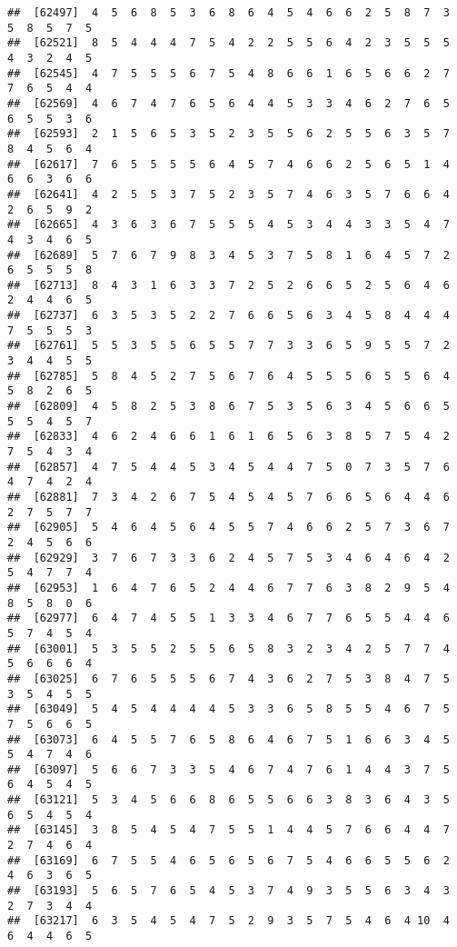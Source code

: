 \documentclass[
]{book}
\begin{document}
\begin{verbatim}
##  [62497]  4  5  6  8  5  3  6  8  6  4  5  4  6  6  2  5  8  7  3  5  8  5  7  5
##  [62521]  8  5  4  4  4  7  5  4  2  2  5  5  6  4  2  3  5  5  5  4  3  2  4  5
##  [62545]  4  7  5  5  5  6  7  5  4  8  6  6  1  6  5  6  6  2  7  7  6  5  4  4
##  [62569]  4  6  7  4  7  6  5  6  4  4  5  3  3  4  6  2  7  6  5  6  5  5  3  6
##  [62593]  2  1  5  6  5  3  5  2  3  5  5  6  2  5  5  6  3  5  7  8  4  5  6  4
##  [62617]  7  6  5  5  5  5  6  4  5  7  4  6  6  2  5  6  5  1  4  6  6  3  6  6
##  [62641]  4  2  5  5  3  7  5  2  3  5  7  4  6  3  5  7  6  6  4  2  6  5  9  2
##  [62665]  4  3  6  3  6  7  5  5  5  4  5  3  4  4  3  3  5  4  7  4  3  4  6  5
##  [62689]  5  7  6  7  9  8  3  4  5  3  7  5  8  1  6  4  5  7  2  6  5  5  5  8
##  [62713]  8  4  3  1  6  3  3  7  2  5  2  6  6  5  2  5  6  4  6  2  4  4  6  5
##  [62737]  6  3  5  3  5  2  2  7  6  6  5  6  3  4  5  8  4  4  4  7  5  5  5  3
##  [62761]  5  5  3  5  5  6  5  5  7  7  3  3  6  5  9  5  5  7  2  3  4  4  5  5
##  [62785]  5  8  4  5  2  7  5  6  7  6  4  5  5  5  6  5  5  6  4  5  8  2  6  5
##  [62809]  4  5  8  2  5  3  8  6  7  5  3  5  6  3  4  5  6  6  5  5  5  4  5  7
##  [62833]  4  6  2  4  6  6  1  6  1  6  5  6  3  8  5  7  5  4  2  7  5  4  3  4
##  [62857]  4  7  5  4  4  5  3  4  5  4  4  7  5  0  7  3  5  7  6  4  7  4  2  4
##  [62881]  7  3  4  2  6  7  5  4  5  4  5  7  6  6  5  6  4  4  6  2  7  5  7  7
##  [62905]  5  4  6  4  5  6  4  5  5  7  4  6  6  2  5  7  3  6  7  2  4  5  6  6
##  [62929]  3  7  6  7  3  3  6  2  4  5  7  5  3  4  6  4  6  4  2  5  4  7  7  4
##  [62953]  1  6  4  7  6  5  2  4  4  6  7  7  6  3  8  2  9  5  4  8  5  8  0  6
##  [62977]  6  4  7  4  5  5  1  3  3  4  6  7  7  6  5  5  4  4  6  5  7  4  5  4
##  [63001]  5  3  5  5  2  5  5  6  5  8  3  2  3  4  2  5  7  7  4  5  6  6  6  4
##  [63025]  6  7  6  5  5  5  6  7  4  3  6  2  7  5  3  8  4  7  5  3  5  4  5  5
##  [63049]  5  4  5  4  4  4  4  5  3  3  6  5  8  5  5  4  6  7  5  7  5  6  6  5
##  [63073]  6  4  5  5  7  6  5  8  6  4  6  7  5  1  6  6  3  4  5  5  4  7  4  6
##  [63097]  5  6  6  7  3  3  5  4  6  7  4  7  6  1  4  4  3  7  5  6  4  5  4  5
##  [63121]  5  3  4  5  6  6  8  6  5  5  6  6  3  8  3  6  4  3  5  6  5  4  5  4
##  [63145]  3  8  5  4  5  4  7  5  5  1  4  4  5  7  6  6  4  4  7  2  7  4  6  4
##  [63169]  6  7  5  5  4  6  5  6  5  6  7  5  4  6  6  5  5  6  2  4  6  3  6  5
##  [63193]  5  6  5  7  6  5  4  5  3  7  4  9  3  5  5  6  3  4  3  2  7  3  4  4
##  [63217]  6  3  5  4  5  4  7  5  2  9  3  5  7  5  4  6  4 10  4  6  4  4  6  5

\end{verbatim}
\end{document}
